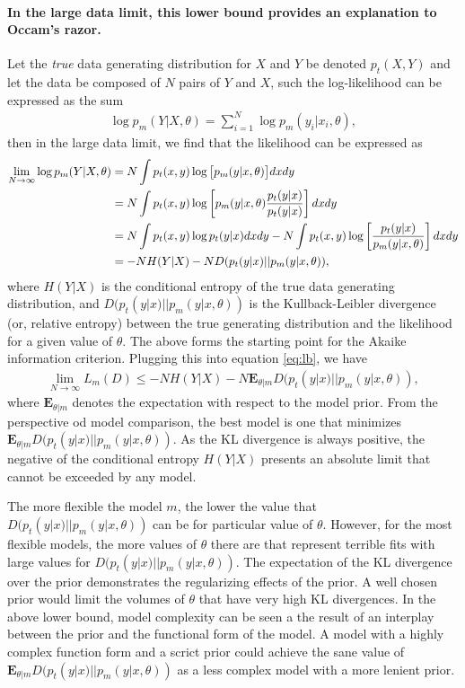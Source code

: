 \documentclass[10pt,a4paper]{article}
\begin{document}
\paragraph{In the large data limit, this lower bound provides an explanation to Occam's razor.} Let the \emph{true} data generating distribution for $X$ and $Y$ be denoted $p_t(X,Y)$ and let the data be composed of $N$ pairs of $Y$ and $X$, such the log-likelihood can be expressed as the sum
\begin{align}
\log p_m(Y|X,\theta)=  \sum^N_{i=1} \log p_m(y_i|x_i,\theta),
\end{align}
then in the large data limit, we find that the likelihood can be expressed as
\begin{align}
\lim_{N \rightarrow \infty} \log p_m(Y|X,\theta) &= N \int p_t(x, y)  \log \big[p_m(y|x,\theta) \big]dx dy \notag\\
&=N \int p_t(x, y)  \log \left[ p_m(y|x,\theta) \frac{p_t(y|x)}{p_t(y|x)} \right] dx dy  \notag\\
&= N  \int p_t(x, y)  \log p_t(y|x) dx dy -N  \int p_t(x, y)  \log \left[  \frac{p_t(y|x)}{p_m(y|x,\theta)} \right] dx dy \notag\\
&= -N H(Y|X) - N D(p_t(y|x) || p_m(y|x,\theta)) ,
\label{eq:asym_like}
\end{align}
where $H(Y|X)$ is the conditional entropy of the true data generating distribution, and $D(p_t(y|x) || p_m(y|x,\theta))$ is the Kullback-Leibler divergence (or, relative entropy) between the true generating distribution and the likelihood for a given value of $\theta$. The above forms the starting point for the Akaike information criterion. Plugging this into equation \ref{eq:lb}, we have
\begin{align}
\lim_{N \rightarrow \infty} L_m(D)  \leq -N H(Y|X) - N \mathbf{E}_{\theta|m} D(p_t(y|x) || p_m(y|x,\theta)),
\end{align}
where $ \mathbf{E}_{\theta|m}$ denotes the expectation with respect to the model prior. From the perspective od model comparison, the best model is one that minimizes $ \mathbf{E}_{\theta|m} D(p_t(y|x) || p_m(y|x,\theta))$. As the KL divergence is always positive, the negative of the conditional entropy $H(Y|X)$ presents an absolute limit that cannot be exceeded by any model. 

The more flexible the model $m$, the lower the value that $D(p_t(y|x) || p_m(y|x,\theta))$ can be for particular value of $\theta$. However, for the most flexible models, the more values of $\theta$ there are that represent terrible fits with large values for $D(p_t(y|x) || p_m(y|x,\theta))$. The expectation of the KL divergence over the prior demonstrates the regularizing effects of the prior. A well chosen prior would limit the volumes of $\theta$ that have very high KL divergences. In the above lower bound, model complexity can be seen a the result of an interplay between the prior and the functional form of the model. A model with a highly complex function form and a scrict prior could achieve the sane value of $\mathbf{E}_{\theta|m} D(p_t(y|x) || p_m(y|x,\theta))$ as a less complex model with a more lenient prior. 
\end{document}
